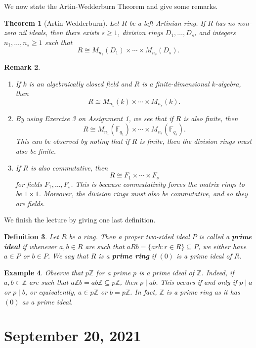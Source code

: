 \documentclass[10pt]{article}
\numberwithin{equation}{section}
\newcommand{\Z}{\mathbb{Z}}
\newcommand{\F}{\mathbb{F}}
\theoremstyle{newstyle}
\newtheorem{thm}{Theorem}[section]
\newtheorem{remark}[thm]{Remark}
\newtheorem{defn}[thm]{Definition}
\newtheorem{exmp}[thm]{Example}
\begin{document}
We now state the Artin-Wedderburn Theorem and give some remarks. 

\begin{thm}[Artin-Wedderburn]
Let $R$ be a left Artinian ring. If $R$ has no non-zero nil ideals, then there exists $s \geq 1$, 
division rings $D_1, \dots, D_s$, and integers $n_1, \dots, n_s \geq 1$ such that 
\[ R \cong M_{n_1}(D_1) \times \cdots \times M_{n_s}(D_s). \]
\end{thm}

\begin{remark}~
\begin{enumerate}[(1)]
    \item If $k$ is an algebraically closed field and $R$ is a finite-dimensional $k$-algebra, then 
    \[ R \cong M_{n_1}(k) \times \cdots \times M_{n_s}(k). \]
    \item By using Exercise 3 on Assignment 1, we see that if $R$ is also finite, then 
    \[ R \cong M_{n_1}(\F_{q_1}) \times \cdots \times M_{n_s}(\F_{q_s}). \]
    This can be observed by noting that if $R$ is finite, then the division rings must also be finite. 
    \item If $R$ is also commutative, then 
    \[ R \cong F_1 \times \cdots \times F_s \]
    for fields $F_1, \dots, F_s$. This is because commutativity forces the matrix rings to be 
    $1 \times 1$. Moreover, the division rings must also be commutative, and so they are fields.
\end{enumerate}
\end{remark}

We finish the lecture by giving one last definition. 

\begin{defn}
Let $R$ be a ring. Then a proper two-sided ideal $P$ is called a {\bf prime ideal} if whenever $a, b \in R$
are such that $aRb = \{arb : r \in R\} \subseteq P$, we either have $a \in P$ or $b \in P$.
We say that $R$ is a {\bf prime ring} if $(0)$ is a prime ideal of $R$. 
\end{defn}

\begin{exmp}
Observe that $p\Z$ for a prime $p$ is a prime ideal of $\Z$. Indeed, if $a, b \in \Z$ are such that 
$a\Z b = ab\Z \subseteq p\Z$, then $p \mid ab$. This occurs if and only if $p \mid a$ or $p \mid b$, 
or equivalently, $a \in p\Z$ or $b = p\Z$. In fact, $\Z$ is a prime ring as it has $(0)$ as a prime 
ideal. 
\end{exmp}

\section{September 20, 2021}
\end{document}
